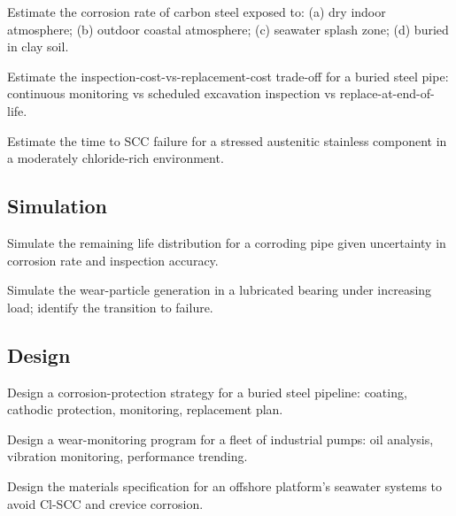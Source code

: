 \begin{exercise}
Estimate the corrosion rate of carbon steel exposed to: (a) dry indoor atmosphere; (b) outdoor coastal atmosphere; (c) seawater splash zone; (d) buried in clay soil.
\end{exercise}

\begin{exercise}
Estimate the inspection-cost-vs-replacement-cost trade-off for a buried steel pipe: continuous monitoring vs scheduled excavation inspection vs replace-at-end-of-life.
\end{exercise}

\begin{exercise}
Estimate the time to SCC failure for a stressed austenitic stainless component in a moderately chloride-rich environment.
\end{exercise}

\subsection*{Simulation}

\begin{exercise}
Simulate the remaining life distribution for a corroding pipe given uncertainty in corrosion rate and inspection accuracy.
\end{exercise}

\begin{exercise}
Simulate the wear-particle generation in a lubricated bearing under increasing load; identify the transition to failure.
\end{exercise}

\subsection*{Design}

\begin{exercise}
Design a corrosion-protection strategy for a buried steel pipeline: coating, cathodic protection, monitoring, replacement plan.
\end{exercise}

\begin{exercise}
Design a wear-monitoring program for a fleet of industrial pumps: oil analysis, vibration monitoring, performance trending.
\end{exercise}

\begin{exercise}
Design the materials specification for an offshore platform's seawater systems to avoid Cl-SCC and crevice corrosion.
\end{exercise}

